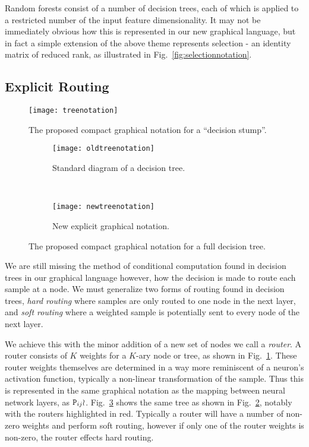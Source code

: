 \documentclass[thesis]{subfiles}
\begin{document}
	Random forests consist of a number of decision trees, each of which is applied to a restricted number of the input feature dimensionality. It may not be immediately obvious how this is represented in our new graphical language, but in fact a simple extension of the above theme represents selection - \ie an identity matrix of reduced rank, as illustrated in Fig.~\ref{fig:selectionnotation}.
	
	\subsection{Explicit Routing}
	\begin{figure}[htbp!] 
		\centering
		\texttt{[image: treenotation]}
		\caption{The proposed compact graphical notation for a ``decision stump''.}
		\label{fig:treeNotation}
	\end{figure}
	
	\begin{figure}[tbp] 
		\centering
		\begin{subfigure}[b]{0.4\textwidth}
			\centering
			\texttt{[image: oldtreenotation]}
			\caption{Standard diagram of a decision tree.}
			\label{fig:oldtreenotation}
		\end{subfigure}
		~
		\begin{subfigure}[b]{0.4\textwidth}
			\centering
			\texttt{[image: newtreenotation]}
			\caption{New explicit graphical notation.}
			\label{fig:newtreenotation}
		\end{subfigure}
		\caption{The proposed compact graphical notation for a full decision tree.}
		\label{fig:complexDecisionTree}
	\end{figure}
	
	We are still missing the method of conditional computation found in decision trees in our graphical language however, \ie how the decision is made to route each sample at a node. We must generalize two forms of routing found in decision trees, \emph{hard routing} where samples are only routed to one node in the next layer, and \emph{soft routing} where a weighted sample is potentially sent to every node of the next layer.
	
	We achieve this with the minor addition of a new set of nodes we call a \emph{router}. A router consists of $K$ weights for a $K$-ary node or tree, as shown in Fig.~\ref{fig:treeNotation}. These router weights themselves are determined in a way more reminiscent of a neuron's activation function, typically a non-linear transformation of the sample. Thus this is represented in the same graphical notation as the mapping between neural network layers, \ie as $\mat P_{ij} \wr$. Fig.~\ref{fig:newtreenotation} shows the same tree as shown in Fig.~\ref{fig:oldtreenotation}, notably with the routers highlighted in red. Typically a router will have a number of non-zero weights and perform soft routing, however if only one of the router weights is non-zero, the router effects hard routing.
	
\end{document}
